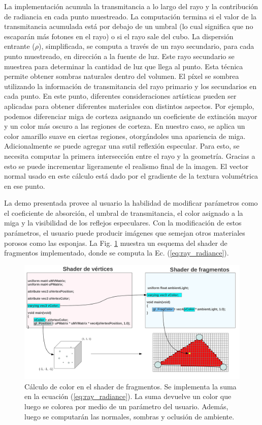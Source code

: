 La implementación acumula la transmitancia a lo largo del rayo y la contribución de radiancia en cada punto muestreado.
La computación termina si el valor de la transmitancia acumulada está por debajo de un umbral (lo cual significa que no escaparán más fotones en el rayo) o si el rayo sale del cubo.
La dispersión entrante ($\rho$), simplificada, se computa a través de un rayo secundario, para cada punto muestreado, en dirección a la fuente de luz.
Este rayo secundario se muestrea para determinar la cantidad de luz que llega al punto.
Esta técnica permite obtener sombras naturales dentro del volumen.
El píxel se sombrea utilizando la información de transmitancia del rayo primario y los secundarios en cada punto.
En este punto, diferentes consideraciones artísticas pueden ser aplicadas para obtener diferentes materiales con distintos aspectos.
Por ejemplo, podemos diferenciar miga de corteza asignando un coeficiente de extinción mayor y un color más oscuro a las regiones de corteza.
En nuestro caso, se aplica un color amarillo suave en ciertas regiones, otorgándoles una apariencia de miga.
Adicionalmente se puede agregar una sutil reflexión especular.
Para esto, se necesita computar la primera intersección entre el rayo y la geometría.
Gracias a esto se puede incrementar ligeramente el realismo final de la imagen.
El vector normal usado en este cálculo está dado por el gradiente de la textura volumétrica en ese punto.

La demo presentada provee al usuario la habilidad de modificar parámetros como el coeficiente de absorción, el umbral de transmitancia, el color asignado a la miga y la visibilidad de los reflejos especulares.
Con la modificación de estos parámetros, el usuario puede producir imágenes que semejan otros materiales porosos como las esponjas.
La Fig. \ref{fg:fragmentshaderrte} muestra un esquema del shader de fragmentos implementado, donde se computa la Ec. (\ref{eq:ray_radiance}).

\begin{figure}[htb!]
\centerline{\includegraphics[width=12cm]{figures/fragmentshader}}
\caption[Cálculo de color en el shader de fragmentos]{Cálculo de color en el shader de fragmentos. Se implementa la suma en la ecuación (\ref{eq:ray_radiance}). La suma devuelve un color que luego se colorea por medio de un parámetro del usuario. Además, luego se computarán las normales, sombras y oclusión de ambiente.}
\label{fg:fragmentshaderrte}
\end{figure}


